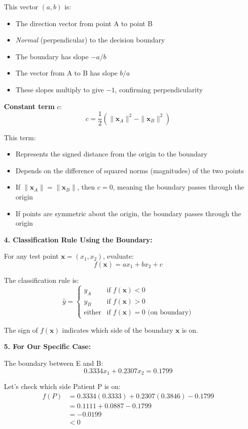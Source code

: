 \documentclass[12pt]{article}
\begin{document}
\begin{explanation}
This vector \((a, b)\) is:
\begin{itemize}
    \item The direction vector from point A to point B
    \item \textit{Normal} (perpendicular) to the decision boundary
    \item The boundary has slope \(-a/b\)
    \item The vector from A to B has slope \(b/a\)
    \item These slopes multiply to give \(-1\), confirming perpendicularity
\end{itemize}

\textbf{Constant term } \(c\):
\[
c = \frac{1}{2}(\|\mathbf{x}_A\|^2 - \|\mathbf{x}_B\|^2)
\]

This term:
\begin{itemize}
    \item Represents the signed distance from the origin to the boundary
    \item Depends on the difference of squared norms (magnitudes) of the two points
    \item If \(\|\mathbf{x}_A\| = \|\mathbf{x}_B\|\), then \(c = 0\), meaning the boundary passes through the origin
    \item If points are symmetric about the origin, the boundary passes through the origin
\end{itemize}

\textbf{4. Classification Rule Using the Boundary:}

For any test point \(\mathbf{x} = (x_1, x_2)\), evaluate:
\[
f(\mathbf{x}) = ax_1 + bx_2 + c
\]

The classification rule is:
\[
\hat{y} = \begin{cases}
y_A & \text{if } f(\mathbf{x}) < 0 \\
y_B & \text{if } f(\mathbf{x}) > 0 \\
\text{either} & \text{if } f(\mathbf{x}) = 0 \text{ (on boundary)}
\end{cases}
\]

The sign of \(f(\mathbf{x})\) indicates which side of the boundary \(\mathbf{x}\) is on.

\textbf{5. For Our Specific Case:}

The boundary between E and B:
\[
0.3334 x_1 + 0.2307 x_2 = 0.1799
\]

Let's check which side Patient P is on:
\begin{align*}
f(P) &= 0.3334(0.3333) + 0.2307(0.3846) - 0.1799 \\
&= 0.1111 + 0.0887 - 0.1799 \\
&= -0.0199 \\
&< 0
\end{align*}


\end{explanation}
\end{document}
